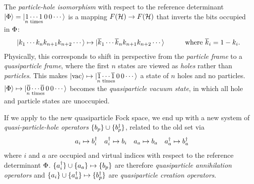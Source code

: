 \documentclass[11pt]{article}
\numberwithin{equation}{section}
\begin{document}
\begin{dfn}\label{dfn:particle-hole-isomorphism}
The \textit{particle-hole isomorphism} with respect to the reference determinant $|\Phi \rangle=|\underset{\text{$n$ times}}{1\cdots1}\,0\,0\cdots\rangle$ is a mapping $F(\mathcal{H})\rightarrow F(\mathcal{H})$ that inverts the bits occupied in $\Phi $:
\begin{align*}
  |k_1\cdots k_nk_{n+1}k_{n+2}\cdots\rangle
\mapsto
  |\overline{k}_1\cdots \overline{k}_nk_{n+1}k_{n+2}\cdots\rangle
\hspace{30pt}
  \text{where $\overline{k}_i=1-k_i$.}
\end{align*}
Physically, this corresponds to shift in perspective from the \textit{particle frame} to a \textit{quasiparticle frame}, where the first $n$ states are viewed as \textit{holes} rather than \textit{particles}.
This makes $|\mathrm{vac}\rangle\mapsto|\underset{\text{$n$ times}}{\overline{1}\cdots\overline{1}}\,0\,0\cdots\rangle$ a state of $n$ holes and no particles.  $|\Phi \rangle\mapsto|\underset{\text{$n$ times}}{\overline{0}\cdots\overline{0}}\,0\,0\cdots\rangle$ becomes the \textit{quasiparticle vacuum state}, in which all hole and particle states are unoccupied.
\end{dfn}

\begin{dfn}
If we apply  to the new quasiparticle Fock space, we end up with a new system of \textit{quasi-particle-hole operators} $\{b_p\}\cup\{b_p^\dagger\}$, related to the old set via
\begin{align}
&&
  a_i
\mapsto
  b_i^\dagger
&&
  a_i^\dagger
\mapsto
  b_i
&&
  a_a
\mapsto
  b_a
&&
  a_a^\dagger
\mapsto
  b_a^\dagger
\end{align}
where $i$ and $a$ are occupied and virtual indices with respect to the reference determinant $\Phi $.
$\{a_i^\dagger\}\cup\{a_a\}\mapsto\{b_p\}$ are therefore \textit{quasiparticle annihilation operators} and $\{a_i\}\cup\{a_a^\dagger\}\mapsto\{b_p^\dagger\}$ are \textit{quasiparticle creation operators}.
\end{dfn}
\end{document}
